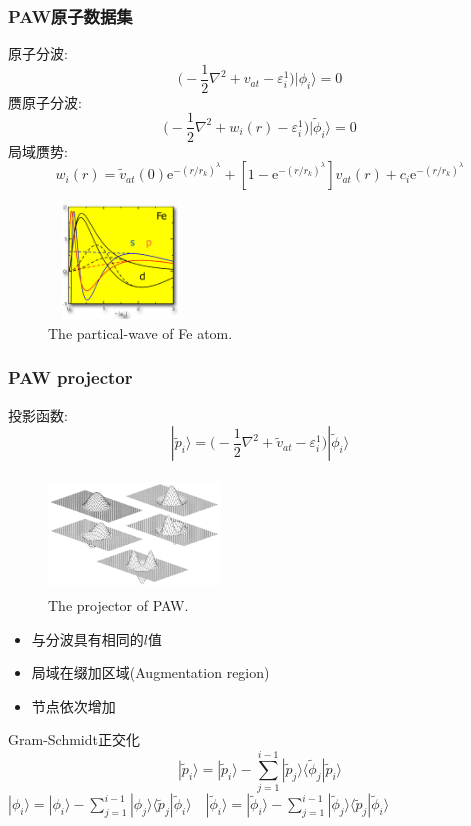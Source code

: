 \documentclass[cjk,slidestop,compress,mathserif,blue]{beamer}
\begin{document}
\frame
{
	\frametitle{\textrm{PAW}原子数据集}
	原子分波:$$\bigg(-\dfrac12\nabla^2+v_{at}-\varepsilon_i^1\bigg)|\phi_i\rangle=0$$
	赝原子分波:$$\bigg(-\dfrac12\nabla^2+w_i(r)-\varepsilon_i^1\bigg)|\tilde\phi_i\rangle=0$$
	局域赝势:%
	$$w_i(r)=\tilde v_{at}(0)\mathrm{e}^{-(r/r_k)^{\lambda}}+[1-\mathrm{e}^{-(r/r_k)^{\lambda}}]v_{at}(r)+c_i\mathrm{e}^{-(r/r_k)^{\lambda}}$$
\begin{figure}[h!]
\centering
\includegraphics[height=1.2in,width=1.5in,viewport=0 0 570 545,clip]{Figures/PAW-partical.png}
\caption{\tiny \textrm{The partical-wave of Fe atom.}}%
\label{PAW_partical_Fe}
\end{figure}
}

\frame
{
	\frametitle{\textrm{PAW projector}}
	投影函数:$$|\tilde p_i\rangle=\bigg(-\dfrac12\nabla^2+\tilde v_{at}-\varepsilon_i^1\bigg)|\tilde\phi_i\rangle$$
\begin{minipage}[t]{0.52\linewidth}
\begin{figure}[h!]
\centering
\vspace*{-0.33in}
\includegraphics[height=1.2in,width=1.8in,viewport=0 0 1100 745,clip]{Figures/PAW_projector-2.png}
\caption{\tiny \textrm{The projector of PAW.}}%
\label{PAW_projector}
\end{figure}
\end{minipage}
\hfill
\begin{minipage}[t]{0.43\linewidth}
\begin{itemize}
	\item 与分波具有相同的$l$值
	\item 局域在缀加区域(\textrm{Augmentation region})
	\item 节点依次增加
\end{itemize}
\end{minipage}
	\textrm{Gram-Schmidt}正交化
	$$|\tilde p_i\rangle=|\tilde p_i\rangle-\sum_{j=1}^{i-1}|\tilde p_j\rangle\langle\tilde\phi_j|\tilde p_i\rangle$$
	$|\phi_i\rangle=|\phi_i\rangle-\sum\limits_{j=1}^{i-1}|\phi_j\rangle\langle\tilde p_j|\tilde\phi_i\rangle\quad|\tilde\phi_i\rangle=|\tilde\phi_i\rangle-\sum\limits_{j=1}^{i-1}|\tilde\phi_j\rangle\langle\tilde p_j|\tilde\phi_i\rangle$
}
\end{document}
